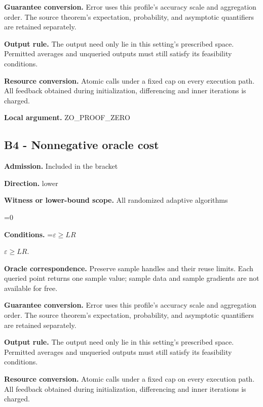 \documentclass[10pt,a4paper]{article}
\newcommand{\AtlasMath}[1]{\par\begingroup\centering\setbox0=\hbox{$\displaystyle #1$}\ifdim\wd0>1.4\linewidth\typeout{ATLAS WIDE FORMULA: \the\wd0}\fi\ifdim\wd0>\linewidth\resizebox{\linewidth}{!}{\box0}\else\box0\fi\par\endgroup}
\newcommand{\AtlasInlineMath}[1]{\begingroup\setbox0=\hbox{$#1$}\ifdim\wd0>.4\linewidth\endgroup\AtlasMath{#1}\else\endgroup$#1$\fi}
\begin{document}
\textbf{Guarantee conversion.} Error uses this profile's accuracy scale and aggregation order. The source theorem's expectation, probability, and asymptotic quantifiers are retained separately.



\textbf{Output rule.} The output need only lie in this setting's prescribed space. Permitted averages and unqueried outputs must still satisfy its feasibility conditions.



\textbf{Resource conversion.} Atomic calls under a fixed cap on every execution path. All feedback obtained during initialization, differencing and inner iterations is charged.



\textbf{Local argument.} ZO\_PROOF\_ZERO



\subsection{B4 - Nonnegative oracle cost}


\textbf{Admission.} Included in the bracket



\textbf{Direction.} lower



\textbf{Witness or lower-bound scope.} All randomized adaptive algorithms



\AtlasMath{0}


\textbf{Conditions.} \AtlasInlineMath{\varepsilon\ge LR}.



\textbf{Oracle correspondence.} Preserve sample handles and their reuse limits. Each queried point returns one sample value; sample data and sample gradients are not available for free.



\textbf{Guarantee conversion.} Error uses this profile's accuracy scale and aggregation order. The source theorem's expectation, probability, and asymptotic quantifiers are retained separately.



\textbf{Output rule.} The output need only lie in this setting's prescribed space. Permitted averages and unqueried outputs must still satisfy its feasibility conditions.



\textbf{Resource conversion.} Atomic calls under a fixed cap on every execution path. All feedback obtained during initialization, differencing and inner iterations is charged.
\end{document}
